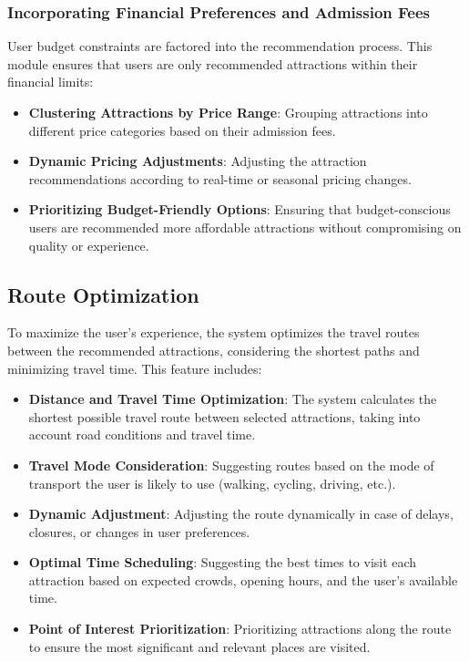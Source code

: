 \subsubsection{Incorporating Financial Preferences and Admission Fees}
User budget constraints are factored into the recommendation process. This module ensures that users are only recommended attractions within their financial limits:
\begin{itemize}
    \item \textbf{Clustering Attractions by Price Range}: Grouping attractions into different price categories based on their admission fees.
    \item \textbf{Dynamic Pricing Adjustments}: Adjusting the attraction recommendations according to real-time or seasonal pricing changes.
    \item \textbf{Prioritizing Budget-Friendly Options}: Ensuring that budget-conscious users are recommended more affordable attractions without compromising on quality or experience.
\end{itemize}

\subsection{Route Optimization}
To maximize the user’s experience, the system optimizes the travel routes between the recommended attractions, considering the shortest paths and minimizing travel time. This feature includes:
\begin{itemize}
    \item \textbf{Distance and Travel Time Optimization}: The system calculates the shortest possible travel route between selected attractions, taking into account road conditions and travel time.
    \item \textbf{Travel Mode Consideration}: Suggesting routes based on the mode of transport the user is likely to use (walking, cycling, driving, etc.).
    \item \textbf{Dynamic Adjustment}: Adjusting the route dynamically in case of delays, closures, or changes in user preferences.
    \item \textbf{Optimal Time Scheduling}: Suggesting the best times to visit each attraction based on expected crowds, opening hours, and the user’s available time.
    \item \textbf{Point of Interest Prioritization}: Prioritizing attractions along the route to ensure the most significant and relevant places are visited.
\end{itemize}

